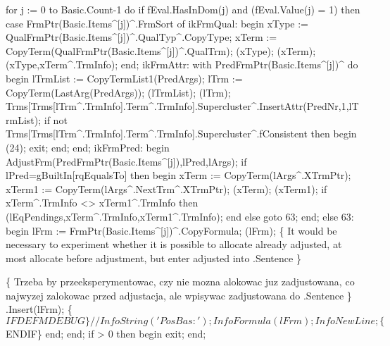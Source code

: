   for j := 0 to Basic.Count-1 do
      if fEval.HasInDom(j) and (fEval.Value(j) = 1) then
         case FrmPtr(Basic.Items^[j])^.FrmSort of
            ikFrmQual:
               begin
                  xType := QualFrmPtr(Basic.Items^[j])^.QualTyp^.CopyType;
                  xTerm := CopyTerm(QualFrmPtr(Basic.Items^[j])^.QualTrm);
                  (xType);
                  (xTerm);
                  (xType,xTerm^.TrmInfo);
               end;
            ikFrmAttr:
               with PredFrmPtr(Basic.Items^[j])^ do
            begin
               lTrmList := CopyTermList1(PredArgs);
               lTrm := CopyTerm(LastArg(PredArgs));
               (lTrmList);
               (lTrm);
               Trms[Trms[lTrm^.TrmInfo].Term^.TrmInfo].Supercluster^.InsertAttr(PredNr,1,lTrmList);
               if not Trms[Trms[lTrm^.TrmInfo].Term^.TrmInfo].Supercluster^.fConsistent
               then
               begin
                  (24);
                  exit;
               end;
            end;
            ikFrmPred:
               begin
                  AdjustFrm(PredFrmPtr(Basic.Items^[j]),lPred,lArgs);
                  if lPred=gBuiltIn[rqEqualsTo] then
                  begin
                     xTerm := CopyTerm(lArgs^.XTrmPtr);
                     xTerm1 := CopyTerm(lArgs^.NextTrm^.XTrmPtr);
                     (xTerm);
                     (xTerm1);
                     if xTerm^.TrmInfo <> xTerm1^.TrmInfo then
                        (lEqPendings,xTerm^.TrmInfo,xTerm1^.TrmInfo);
                  end
                  else goto 63;
               end;
         else
            63:
               begin
                  lFrm := FrmPtr(Basic.Items^[j])^.CopyFormula;
                  (lFrm);
                  \{ It would be necessary to experiment whether it is
                    possible to allocate already adjusted, at most
                    allocate before adjustment, but enter adjusted into
                    .Sentence \}
                  
                  \{ Trzeba by przeeksperymentowac, czy nie mozna alokowac juz zadjustowana,
                    co najwyzej zalokowac przed adjustacja, ale wpisywac zadjustowana do
                    .Sentence
                  \}
                  .Insert(lFrm);
                  \{$IFDEF MDEBUG\}
                  // InfoString('PosBas: '); InfoFormula(lFrm); InfoNewLine;
                  \{$ENDIF\}
               end;
         end;
   if  > 0 then
   begin
      exit;
   end;
   
